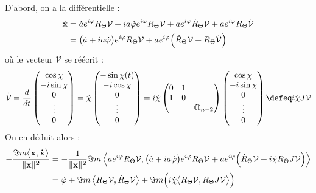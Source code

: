 \begin{demo}
	D'abord, on a la différentielle :
	\begin{align*}
		\dot{\bf{x}} &= \dot{a}e^{i\varphi}R_{\Theta} \mathcal{V} + ia\dot{\varphi}e^{i\varphi} R_{\Theta} \mathcal{V} + ae^{i\varphi}\dot{R}_{\Theta}\mathcal{V} + ae^{i\varphi}R_\Theta\dot{\mathcal{V}} \\
		&= \big(\dot{a} + ia\dot{\varphi}\big)e^{i\varphi}R_{\Theta} \mathcal{V} + ae^{i\varphi}\Big(\dot{R}_{\Theta}\mathcal{V} + R_\Theta\dot{\mathcal{V}}\Big)
	\end{align*}
	où le vecteur $\dot{\mathcal{V}}$ se réécrit :
	\begin{align*}
		\dot{\mathcal{V}} = \frac{d}{dt}\begin{pmatrix}
			\cos\chi \\ -i\sin\chi \\ 0 \\ \vdots \\ 0 
		\end{pmatrix} = \dot{\chi}\begin{pmatrix}
			-\sin\chi(t) \\ -i\cos\chi \\ 0 \\ \vdots \\ 0 
		\end{pmatrix} = i \dot{\chi} \begin{pmatrix}
			0 & 1 \\ 1 & 0 \\ & & \mathbb{O}_{n-2}
		\end{pmatrix}\begin{pmatrix} 
			\cos\chi \\ -i\sin\chi \\ 0 \\ \vdots \\ 0 
		\end{pmatrix} \defeq i\dot{\chi}J\mathcal{V}
	\end{align*}
	On en déduit alors :
	\begin{align*}
			-\frac{\Im m\big\langle \bf{x},\dot{\bf{x}}\big\rangle}{\|\bf{x}\|^2} &= -\frac{1}{\|\bf{x}\|^2}\Im m \left\langle ae^{i\varphi}R_\Theta \mathcal{V},  \big(\dot{a} + ia\dot{\varphi}\big)e^{i\varphi}R_{\Theta} \mathcal{V} + ae^{i\varphi}\Big(\dot{R}_{\Theta}\mathcal{V} + i\dot{\chi}R_\Theta J\mathcal{V}\Big)\right\rangle \\
			&= \dot{\varphi} + \Im m \left\langle R_\Theta \mathcal{V},   \dot{R}_{\Theta}\mathcal{V}\right\rangle + \Im m \Big( i\dot{\chi} \big\langle R_\Theta \mathcal{V}, R_\Theta J\mathcal{V}\big\rangle \Big) \\

\end{align*}
\end{demo}
